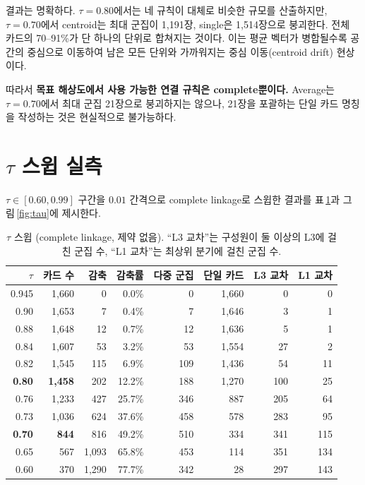 \documentclass[11pt,a4paper]{article}
\begin{document}
결과는 명확하다. $\tau=0.80$에서는 네 규칙이 대체로 비슷한 규모를 산출하지만, $\tau=0.70$에서 centroid는 최대 군집이 1{,}191장, single은 1{,}514장으로 붕괴한다. 전체 카드의 70--91\%가 단 하나의 단위로 합쳐지는 것이다. 이는 평균 벡터가 병합될수록 공간의 중심으로 이동하여 남은 모든 단위와 가까워지는 중심 이동(centroid drift) 현상이다.

따라서 \textbf{목표 해상도에서 사용 가능한 연결 규칙은 complete뿐이다.} Average는 $\tau=0.70$에서 최대 군집 21장으로 붕괴하지는 않으나, 21장을 포괄하는 단일 카드 명칭을 작성하는 것은 현실적으로 불가능하다.

\section{$\tau$ 스윕 실측}

$\tau \in [0.60, 0.99]$ 구간을 $0.01$ 간격으로 complete linkage로 스윕한 결과를 표\,\ref{tab:sweep}과 그림\,\ref{fig:tau}에 제시한다.

\begin{table}[h]
\centering
\small
\begin{tabular}{@{}rrrrrrrr@{}}
\toprule
$\tau$ & 카드 수 & 감축 & 감축률 & 다중 군집 & 단일 카드 & L3 교차 & L1 교차 \\
\midrule
0.945 & 1{,}660 & 0 & 0.0\% & 0 & 1{,}660 & 0 & 0 \\
0.90 & 1{,}653 & 7 & 0.4\% & 7 & 1{,}646 & 3 & 1 \\
0.88 & 1{,}648 & 12 & 0.7\% & 12 & 1{,}636 & 5 & 1 \\
0.84 & 1{,}607 & 53 & 3.2\% & 53 & 1{,}554 & 27 & 2 \\
0.82 & 1{,}545 & 115 & 6.9\% & 109 & 1{,}436 & 54 & 11 \\
\textbf{0.80} & \textbf{1{,}458} & 202 & 12.2\% & 188 & 1{,}270 & 100 & 25 \\
0.76 & 1{,}233 & 427 & 25.7\% & 346 & 887 & 205 & 64 \\
0.73 & 1{,}036 & 624 & 37.6\% & 458 & 578 & 283 & 95 \\
\textbf{0.70} & \textbf{844} & 816 & 49.2\% & 510 & 334 & 341 & 115 \\
0.65 & 567 & 1{,}093 & 65.8\% & 453 & 114 & 351 & 134 \\
0.60 & 370 & 1{,}290 & 77.7\% & 342 & 28 & 297 & 143 \\
\bottomrule
\end{tabular}
\caption{$\tau$ 스윕 (complete linkage, 제약 없음). ``L3 교차''는 구성원이 둘 이상의 L3에 걸친 군집 수, ``L1 교차''는 최상위 분기에 걸친 군집 수.}
\label{tab:sweep}
\end{table}
\end{document}

